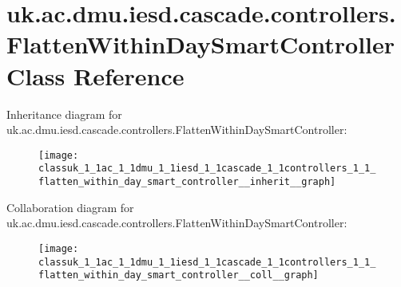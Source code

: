 \hypertarget{classuk_1_1ac_1_1dmu_1_1iesd_1_1cascade_1_1controllers_1_1_flatten_within_day_smart_controller}{\section{uk.\-ac.\-dmu.\-iesd.\-cascade.\-controllers.\-Flatten\-Within\-Day\-Smart\-Controller Class Reference}
\label{classuk_1_1ac_1_1dmu_1_1iesd_1_1cascade_1_1controllers_1_1_flatten_within_day_smart_controller}
}


Inheritance diagram for uk.\-ac.\-dmu.\-iesd.\-cascade.\-controllers.\-Flatten\-Within\-Day\-Smart\-Controller\-:\nopagebreak
\begin{figure}[H]
\begin{center}
\leavevmode
\texttt{[image: classuk\_1\_1ac\_1\_1dmu\_1\_1iesd\_1\_1cascade\_1\_1controllers\_1\_1\_flatten\_within\_day\_smart\_controller\_\_inherit\_\_graph]}
\end{center}
\end{figure}


Collaboration diagram for uk.\-ac.\-dmu.\-iesd.\-cascade.\-controllers.\-Flatten\-Within\-Day\-Smart\-Controller\-:\nopagebreak
\begin{figure}[H]
\begin{center}
\leavevmode
\texttt{[image: classuk\_1\_1ac\_1\_1dmu\_1\_1iesd\_1\_1cascade\_1\_1controllers\_1\_1\_flatten\_within\_day\_smart\_controller\_\_coll\_\_graph]}
\end{center}
\end{figure}
